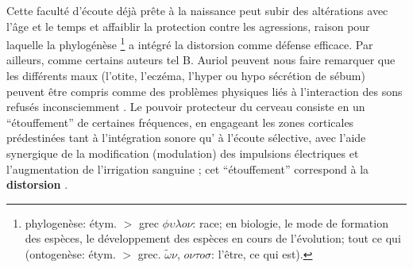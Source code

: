Cette faculté d'écoute déjà prête à la naissance peut subir des
altérations avec l'âge et
le temps et affaiblir la protection contre les agressions, raison pour
laquelle la phylogénèse \footnote{ phylogenèse: étym. $>$ grec $\phi
  \upsilon \lambda o \nu $: race; en biologie, le mode de formation des espèces, le développement
  des espèces en cours de l'évolution; tout ce qui (ontogenèse:
  étym. $>$ grec. $\tilde{\omega}\nu$, $o \nu \tau o
  \sigma$: l'être,
ce qui est).}  a intégré la distorsion comme défense
efficace.
Par ailleurs, comme certains auteurs tel B. Auriol peuvent nous faire
remarquer que
les différents maux (l'otite, l'eczéma, l'hyper
ou hypo sécrétion de sébum) peuvent être compris comme des problèmes physiques liés à l'interaction des sons refusés
inconsciemment \autocite [19--20] {auriol:cle}.
Le pouvoir protecteur du cerveau consiste en un  ``étouffement'' de
certaines fréquences,  en engageant les zones corticales prédestinées
tant à
l'intégration sonore qu' à l'écoute sélective,  avec l'aide synergique de la
modification (modulation) des impulsions électriques et l'augmentation de
l'irrigation sanguine \autocite [14] {auriol:cle};
cet ``étouffement'' correspond à la \textbf{distorsion}
\autocite{tomatis:education}.



